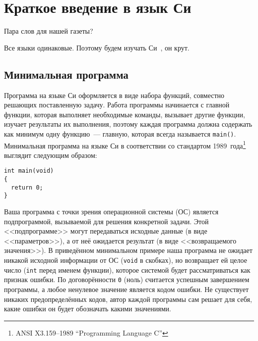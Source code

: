 \chapter{Краткое введение в язык Си}

Пара слов для нашей газеты?

Все языки одинаковые. Поэтому будем изучать Си~\cite{podbelsky2015kurs}, он крут.


\section{Минимальная программа}

Программа на языке Си оформляется в виде набора функций, совместно решающих
поставленную задачу. Работа программы начинается с главной функции, которая
выполняет необходимые команды, вызывает другие функции, изучает результаты их
выполнения, поэтому каждая программа должна содержать как минимум одну
функцию~--- главную, которая всегда называется \texttt{main()}. Минимальная
программа на языке Си в соответствии со стандартом
1989~года\footnote{ANSI X3.159--1989 ``Programming Language C''} выглядит
следующим образом:

\begin{verbatim}
int main(void)
{
  return 0;
}
\end{verbatim}

Ваша программа с точки зрения операционной системы (ОС) является
подпрограммой, вызываемой для решения конкретной задачи. Этой <<подпрограмме>>
могут передаваться исходные данные (в виде <<параметров>>), а от неё ожидается
результат (в виде <<возвращаемого значения>>). В приведённом минимальном
примере наша программа не ожидает никакой исходной информации от ОС
(\texttt{void} в скобках), но возвращает ей целое число (\texttt{int} перед
именем функции), которое системой будет рассматриваться как признак ошибки. По
договорённости \texttt{0} (ноль) считается успешным завершением программы, а любое
ненулевое значение является кодом ошибки. Не существует никаких
предопределённых кодов, автор каждой программы сам решает для себя, какие
ошибки он будет обозначать какими значениями.


